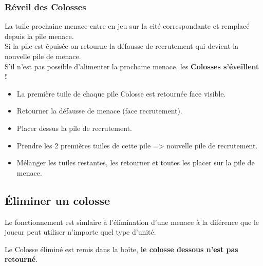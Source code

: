 \documentclass[10pt, a4paper]{article}	%
\begin{document}
\begin{multicols}{3}
\subsubsection{Réveil des Colosses} %
\label{ssub:reveil_des_colosses}
La tuile \og{}prochaine menace\fg{} entre en jeu sur la cité correspondante et remplacé depuis la pile menace.\\
Si la pile est épuisée on retourne la défausse de recrutement qui devient la nouvelle pile de menace.\\
S'il n'est pas possible d'alimenter la prochaine menace, les \textbf{Colosses s'éveillent !}
\begin{itemize}
    \item La première tuile de chaque pile Colosse est retournée face visible.
    \item Retourner la défausse de menace (face recrutement).
    \item Placer dessus la pile de recrutement.
    \item Prendre les 2 premières tuiles de cette pile => nouvelle pile de recrutement.
    \item Mélanger les tuiles restantes, les retourner et toutes les placer sur la pile de menace.
\end{itemize}

\subsection{Éliminer un colosse} %
\label{sub:eliminer_un_colosse}
Le fonctionnement est simlaire à l'élimination d'une menace à la diférence que le joueur peut utiliser n'importe quel type d'unité.

Le Colosse éliminé est remis dans la boîte, \textbf{le colosse dessous n'est pas retourné}.



\end{multicols}
\end{document}
